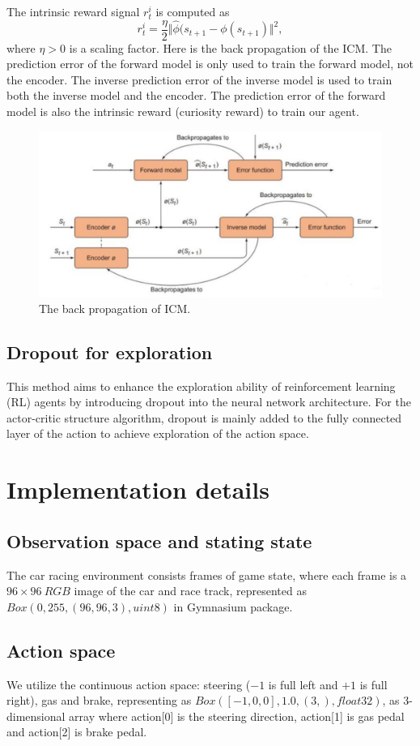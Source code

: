 \documentclass{article}
\begin{document}
The intrinsic reward signal $r_t^i$ is computed as 
\[
r_t^i = \frac{\eta}{2}\Vert\hat{\phi}(s_{t+1}-\phi(s_{t+1})\Vert^2,
\] where $\eta>0$ is a scaling factor.
Here is the back propagation of the ICM. The prediction error of the forward model is only used to train the forward model, not the encoder. The inverse prediction error of the inverse model is used to train both the inverse model and the encoder. The prediction error of the forward model is also the intrinsic reward (curiosity reward) to train our agent.
\begin{figure}[!ht]
	\centering
	\includegraphics[width=0.5\linewidth]{figure/BackPropagation.png}
	\caption{The back propagation of ICM.}
	\label{fig:enter-label}
\end{figure}


\subsection{Dropout for exploration}
This method aims to enhance the exploration ability of reinforcement learning (RL) agents by introducing dropout into the neural network architecture. For the actor-critic structure algorithm, dropout is mainly added to the fully connected layer of the action to achieve exploration of the action space.


\section{Implementation details}
\subsection{Observation space and stating state}
The car racing environment consists frames of game state, where each frame is a $96\times 96\ RGB$ image of the car and race track, represented as $Box(0,255,(96,96,3),uint8)$ in Gymnasium package.

\subsection{Action space}
We utilize the continuous action space: steering ($-1$ is full left and $+1$ is full right), gas and brake, representing as $Box([-1,0,0],1.0,(3,),float32)$, as 3-dimensional array where action[0] is the steering direction, action[1] is gas pedal and action[2] is brake pedal.
\end{document}
